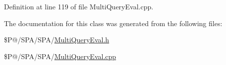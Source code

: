 Definition at line 119 of file Multi\-Query\-Eval.\-cpp.



The documentation for this class was generated from the following files\-:\begin{DoxyCompactItemize}
\item 
\$\-P@/\-S\-P\-A/\-S\-P\-A/\hyperlink{_multi_query_eval_8h}{Multi\-Query\-Eval.\-h}\item 
\$\-P@/\-S\-P\-A/\-S\-P\-A/\hyperlink{_multi_query_eval_8cpp}{Multi\-Query\-Eval.\-cpp}\end{DoxyCompactItemize}
